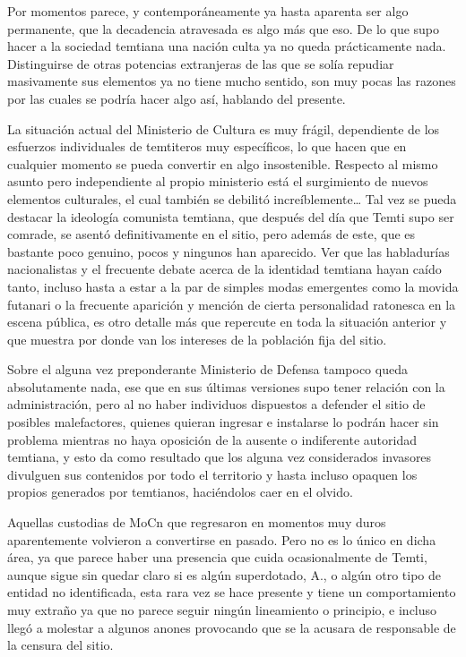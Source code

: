 \documentclass[
]{book}
\begin{document}
Por momentos parece, y contemporáneamente ya hasta aparenta ser algo permanente, que la decadencia atravesada es algo más que eso. De lo que supo hacer a la sociedad temtiana una nación culta ya no queda prácticamente nada. Distinguirse de otras potencias extranjeras de las que se solía repudiar masivamente sus elementos ya no tiene mucho sentido, son muy pocas las razones por las cuales se podría hacer algo así, hablando del presente.

La situación actual del Ministerio de Cultura es muy frágil, dependiente de los esfuerzos individuales de temtiteros muy específicos, lo que hacen que en cualquier momento se pueda convertir en algo insostenible. Respecto al mismo asunto pero independiente al propio ministerio está el surgimiento de nuevos elementos culturales, el cual también se debilitó increíblemente\ldots{} Tal vez se pueda destacar la ideología comunista temtiana, que después del día que Temti supo ser comrade, se asentó definitivamente en el sitio, pero además de este, que es bastante poco genuino, pocos y ningunos han aparecido. Ver que las habladurías nacionalistas y el frecuente debate acerca de la identidad temtiana hayan caído tanto, incluso hasta a estar a la par de simples modas emergentes como la movida futanari o la frecuente aparición y mención de cierta personalidad ratonesca en la escena pública, es otro detalle más que repercute en toda la situación anterior y que muestra por donde van los intereses de la población fija del sitio.

Sobre el alguna vez preponderante Ministerio de Defensa tampoco queda absolutamente nada, ese que en sus últimas versiones supo tener relación con la administración, pero al no haber individuos dispuestos a defender el sitio de posibles malefactores, quienes quieran ingresar e instalarse lo podrán hacer sin problema mientras no haya oposición de la ausente o indiferente autoridad temtiana, y esto da como resultado que los alguna vez considerados invasores divulguen sus contenidos por todo el territorio y hasta incluso opaquen los propios generados por temtianos, haciéndolos caer en el olvido.

Aquellas custodias de MoCn que regresaron en momentos muy duros aparentemente volvieron a convertirse en pasado. Pero no es lo único en dicha área, ya que parece haber una presencia que cuida ocasionalmente de Temti, aunque sigue sin quedar claro si es algún superdotado, A., o algún otro tipo de entidad no identificada, esta rara vez se hace presente y tiene un comportamiento muy extraño ya que no parece seguir ningún lineamiento o principio, e incluso llegó a molestar a algunos anones provocando que se la acusara de responsable de la censura del sitio.
\end{document}
